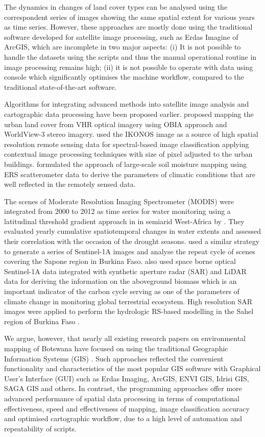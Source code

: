 \documentclass[knowledge,article,submit,pdftex,moreauthors]{Definitions/mdpi}
\begin{document}
The dynamics in changes of land cover types can be analysed using the correspondent series of images showing the same spatial extent for various years as time series. However, these approaches are mostly done using the traditional software developed for satellite image processing, such as Erdas Imagine of ArcGIS, which are incomplete in two major aspects: (i) It is not possible to handle the datasets using the scripts and thus the manual operational routine in image processing remains high; (ii) it is not possible to operate with data using console which significantly optimises the machine workflow, compared to the traditional state-of-the-art software. 

Algorithms for integrating advanced methods into satellite image analysis and cartographic data processing have been proposed earlier. \cite{7924570} proposed mapping the urban land cover from VHR optical imagery using OBIA approach and WorldView-3 stereo imagery. \cite{985893} used the IKONOS image as a source of high spatial resolution remote sensing data for spectral-based image classification applying contextual image processing techniques with size of pixel adjusted to the urban buildings. \cite{851761} formulated the approach of large-scale soil moisture mapping using ERS scatterometer data to derive the parameters of climatic conditions that are well reflected in the remotely sensed data. 

The scenes of Moderate Resolution Imaging Spectrometer (MODIS) were integrated from 2000 to 2012 as time series for water monitoring using a latitudinal threshold gradient approach in in semiarid West-Africa by \cite{6875901}. They evaluated yearly cumulative spatiotemporal changes in water extents and assessed their correlation with the occasion of the drought seasons. \cite{8898897} used a similar strategy to generate a series of Sentinel-1A images and analyse the repeat cycle of scenes covering the Sapone region in Burkina Faso. \cite{s23010349} also used space borne optical Sentinel-1A data integrated with synthetic aperture radar (SAR) and LiDAR data for deriving the information on the aboveground biomass which is an important indicator of the carbon cycle serving as one of the parameters of climate change in monitoring global terrestrial ecosystem. High resolution SAR images were applied to perform the hydrologic RS-based modelling in the Sahel region of Burkina Faso \cite{6103630}.

We argue, however, that nearly all existing research papers on environmental mapping of Botswana have focused on using the traditional Geographic Information Systems (GIS) \cite{Augusseau,AFR350,hydrology9010012,land7040124,ZOUNGRANA201866,cecchi2008towards,Forkuor}. Such approaches reflected the convenient functionality and characteristics of the most popular GIS software with Graphical User's Interface (GUI) such as Erdas Imaging, ArcGIS, ENVI GIS, Idrisi GIS, SAGA GIS and others. In contrast, the programming approaches offer more advanced performance of spatial data processing in terms of computational effectiveness, speed and effectiveness of mapping, image classification accuracy and optimised cartographic workflow, due to a high level of automation and repeatability of scripts.
\end{document}
